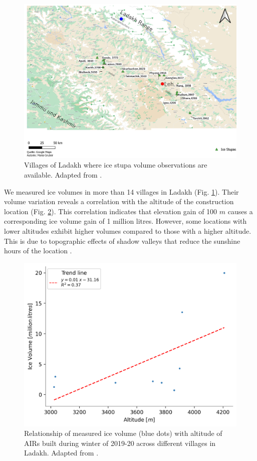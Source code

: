 \begin{figure}[htb]
	\includegraphics[width=\textwidth]{figs/ISC_villages}
	\caption{Villages of Ladakh where ice stupa volume observations are available. Adapted from \citet{mariagruberIceStupasLadakh2022}.}
	\label{fig:villages}
\end{figure}

We measured ice volumes in more than 14 villages in Ladakh (Fig. \ref{fig:villages}). Their volume variation
reveals a correlation with the altitude of the construction location (Fig. \ref{fig:altvsvol}). This correlation
indicates that elevation gain of 100 $m$ causes a corresponding ice volume gain of 1 million litres. However,
some locations with lower altitudes exhibit higher volumes compared to those with a higher altitude. This is due
to topographic effects of shadow valleys that reduce the sunshine hours of the location
\citep{mariagruberIceStupasLadakh2022}.

\begin{figure}[htb]
	\centering
	\includegraphics[width=\textwidth]{figs/altitudevsvolume.png}
	\caption{Relationship of measured ice volume (blue dots) with altitude of \ac{AIRs} built during winter of 2019-20 across
		different villages in Ladakh. Adapted from \citet{mariagruberIceStupasLadakh2022}.}
	\label{fig:altvsvol}
\end{figure}

